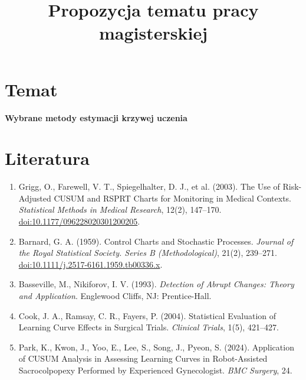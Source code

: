 \documentclass[12pt,a4paper]{article}
\title{Propozycja tematu pracy magisterskiej}
\author{}
\date{}
\begin{document}
\maketitle

\section*{Temat}

\textbf{Wybrane metody estymacji krzywej uczenia}

\section*{Literatura}

\begin{enumerate}
    \item Grigg, O., Farewell, V. T., Spiegelhalter, D. J., et al. (2003).
    The Use of Risk-Adjusted CUSUM and RSPRT Charts for Monitoring in Medical Contexts.
    \textit{Statistical Methods in Medical Research}, 12(2), 147--170.
    \href{https://doi.org/10.1177/096228020301200205}{doi:10.1177/096228020301200205}.

    \item Barnard, G. A. (1959).
    Control Charts and Stochastic Processes.
    \textit{Journal of the Royal Statistical Society. Series B (Methodological)},
    21(2), 239--271.
    \href{https://doi.org/10.1111/j.2517-6161.1959.tb00336.x}
    {doi:10.1111/j.2517-6161.1959.tb00336.x}.

    \item Basseville, M., Nikiforov, I. V. (1993).
    \textit{Detection of Abrupt Changes: Theory and Application}.
    Englewood Cliffs, NJ: Prentice-Hall.

    \item Cook, J. A., Ramsay, C. R., Fayers, P. (2004).
    Statistical Evaluation of Learning Curve Effects in Surgical Trials.
    \textit{Clinical Trials}, 1(5), 421--427.

    \item Park, K., Kwon, J., Yoo, E., Lee, S., Song, J., Pyeon, S. (2024).
    Application of CUSUM Analysis in Assessing Learning Curves in Robot-Assisted
    Sacrocolpopexy Performed by Experienced Gynecologist.
    \textit{BMC Surgery}, 24.
\end{enumerate}
\end{document}
